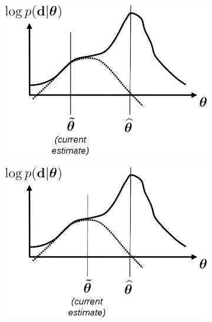 \documentclass[10pt,twoside]{book}
\begin{document}
\begin{figure}
\begin{subfigure}{0.48\textwidth}
    \includegraphics[width=\textwidth]{lowerBound3}
    \caption{}
    \label{fig:lowerboundOptimization_3}
  \end{subfigure}
  \hfill
  \begin{subfigure}{0.48\textwidth}
    \centering
    \includegraphics[width=\textwidth]{lowerBound4}
    \caption{}
    \label{fig:lowerboundOptimization_4}
  \end{subfigure}
  \begin{subfigure}{0.48\textwidth}
    \centering

\end{subfigure}
\end{figure}
\end{document}
